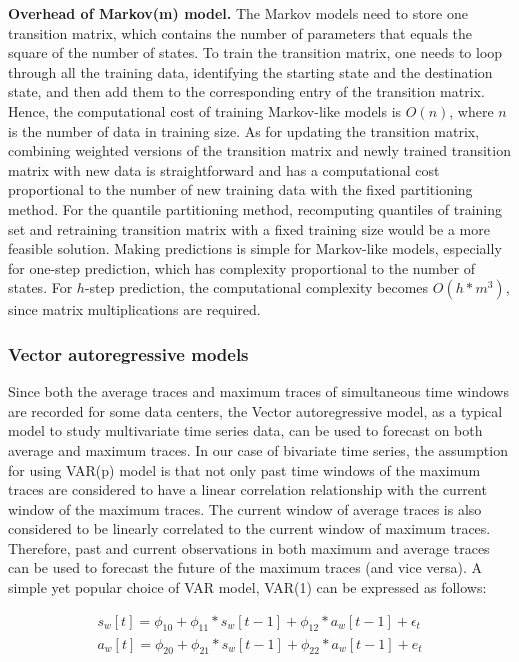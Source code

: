 \documentclass[sigplan,10pt,review,anonymous]{acmart}
\begin{document}
\textbf{Overhead of Markov(m) model.} The Markov models need to store one
transition matrix, which contains the number of parameters that equals the
square of the number of states. To train the transition matrix, one needs to
loop through all the training data, identifying the starting state and the
destination state, and then add them to the corresponding entry of the
transition matrix. Hence, the computational cost of training Markov-like models
is $O(n)$, where $n$ is the number of data in training size. As for updating the
transition matrix, combining weighted versions of the transition matrix and
newly trained transition matrix with new data is straightforward and has a
computational cost proportional to the number of new training data with the
fixed partitioning method. For the quantile partitioning method, recomputing
quantiles of training set and retraining transition matrix with a fixed training
size would be a more feasible solution. Making predictions is simple for
Markov-like models, especially for one-step prediction, which has complexity
proportional to the number of states. For $h$-step prediction, the computational
complexity becomes $O(h * m^3)$, since matrix multiplications are required.

\subsubsection{Vector autoregressive models}

Since both the average traces and maximum traces of simultaneous time windows
are recorded for some data centers, the Vector autoregressive model, as a
typical model to study multivariate time series data, can be used to forecast on
both average and maximum traces. In our case of bivariate time series, the
assumption for using VAR(p) model is that not only past time windows of the
maximum traces are considered to have a linear correlation relationship with the
current window of the maximum traces. The current window of average traces is
also considered to be linearly correlated to the current window of maximum
traces. Therefore, past and current observations in both maximum and average
traces can be used to forecast the future of the maximum traces (and vice
versa). A simple yet popular choice of VAR model, VAR(1) can be expressed as
follows:

\begin{equation}
  \begin{aligned}
    s_w[t] = \phi_{10} + \phi_{11} * s_w[t - 1] + \phi_{12} * a_w[t - 1] + \epsilon_t\\
    a_w[t] = \phi_{20} + \phi_{21} * s_w[t - 1] + \phi_{22} * a_w[t - 1] + e_t
  \end{aligned}
\end{equation}
\end{document}
